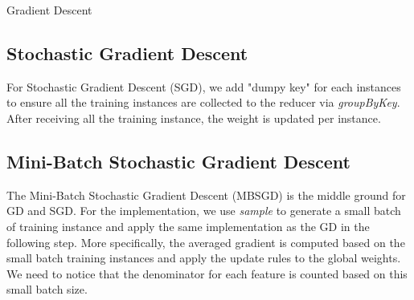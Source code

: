 \documentclass[sigconf]{acmart}
\makeatletter
\def\BState{\State\hskip-\ALG@thistlm}
\makeatother
\begin{document}
\begin{algorithm}
\caption{Gradient Descent}\label{euclid}
\end{algorithm}



\subsection{Stochastic Gradient Descent}
\label{sec:implementationSGD}

For Stochastic Gradient Descent (SGD), we add "dumpy key" for each instances to ensure all the training instances are collected to the reducer via \textit{groupByKey}. After receiving all the training instance, the weight is updated per instance. 


\subsection{Mini-Batch Stochastic Gradient Descent}
\label{sec:implementationMBGD}

The Mini-Batch Stochastic Gradient Descent (MBSGD) is the middle ground for GD and SGD. For the implementation, we use \textit{sample} to generate a small batch of training instance and apply the same implementation as the GD in the following step. More specifically, the averaged gradient is computed based on the small batch training instances and apply the update rules to the global weights. We need to notice that the denominator for each feature is counted based on this small batch size. 
\end{document}
